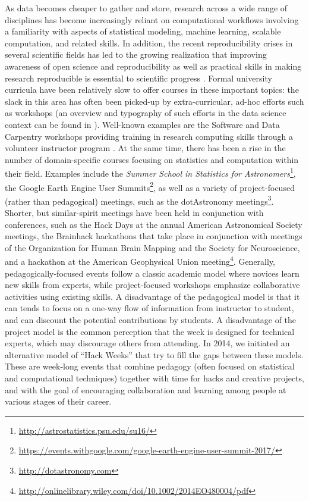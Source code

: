 \label{sec:introduction}

As data becomes cheaper to gather and store, research across a wide range of disciplines has become increasingly reliant on computational workflows involving a familiarity with aspects of statistical modeling, machine learning, scalable computation, and related skills. In addition, the recent reproducibility crises in several scientific fields has led to the growing realization that improving awareness of open science and reproducibility as well as practical skills in making research reproducible is essential to scientific progress \cite[e.g.][]{pashler2012,frye2015,gezelter2015,baker2016}.
Formal university curricula have been relatively slow to offer courses in these important topics: the slack in this area has often been picked-up by extra-curricular, ad-hoc efforts such as workshops (an overview and typography of such efforts in the data science context can be found in \cite{demasi2017}).
Well-known examples are the Software and Data Carpentry workshops providing training in research computing skills through a volunteer instructor program  \cite{b:wilson-swc-lessons-2016,teal2015data}.
At the same time, there has been a rise in the number of domain-specific courses focusing on statistics and computation within their field.
Examples include the \textit{Summer School in Statistics for Astronomers}\footnote{\url{http://astrostatistics.psu.edu/su16/}}, the Google Earth Engine User Summits\footnote{\url{https://events.withgoogle.com/google-earth-engine-user-summit-2017/}}, as well as a variety of project-focused (rather than pedagogical) meetings, such as the dotAstronomy meetings\footnote{\url{http://dotastronomy.com}}.
Shorter, but similar-spirit meetings have been held in conjunction with conferences, such as the Hack Days at the annual American Astronomical Society meetings, the Brainhack hackathons that take place in conjunction with meetings of the Organization for Human Brain Mapping and the Society for Neuroscience\cite{Cameron_Craddock2016-wc}, and a hackathon at the American Geophysical Union meeting\footnote{\url{http://onlinelibrary.wiley.com/doi/10.1002/2014EO480004/pdf}}.
Generally, pedagogically-focused events follow a classic academic model where novices learn new skills from experts, while project-focused workshops emphasize collaborative activities using existing skills.
A disadvantage of the pedagogical model is that it can tends to focus on a one-way flow of information from instructor to student, and can discount the potential contributions by students.
A disadvantage of the project model is the common perception that the week is designed for technical experts, which may discourage others from attending.
In 2014, we initiated an alternative model of ``Hack Weeks'' that try to fill the gaps between these models.
These are week-long events that combine pedagogy (often focused on statistical and computational techniques) together with time for hacks and creative projects, and with the goal of encouraging collaboration and learning among people at various stages of their career.

